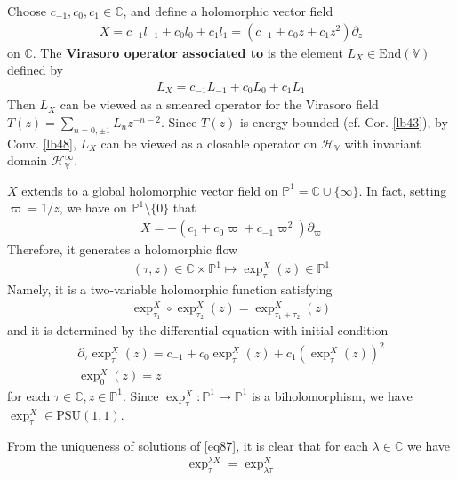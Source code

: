 \documentclass[12pt,b5paper,notitlepage]{article}
\theoremstyle{definition}
\theoremstyle{plain}
\newcommand{\End}{\mathrm{End}} %
\newcommand{\PSU}{\mathrm{PSU}(1,1)}
\newcommand{\Vbb}{\mathbb V}
\newcommand{\Cbb}{\mathbb C}
\newcommand{\Pbb}{\mathbb P}
\newcommand{\HV}{\mathcal H_{\mathbb V}}
\numberwithin{equation}{section}
\begin{document}
Choose $c_{-1},c_0,c_1\in\Cbb$, and define a holomorphic vector field
\begin{align}\label{eq83}
X=c_{-1}l_{-1}+c_0l_0+c_1l_1=(c_{-1}+c_0z+c_1z^2)\partial_z
\end{align}
on $\Cbb$. The \textbf{Virasoro operator associated to } is the element $L_X\in\End(\Vbb)$ defined by 
\begin{align}
L_X=c_{-1}L_{-1}+c_0L_0+c_1L_1
\end{align}
Then $L_X$ can be viewed as a smeared operator for the Virasoro field $T(z)=\sum_{n=0,\pm1}L_nz^{-n-2}$. Since $T(z)$ is energy-bounded (cf. Cor. \ref{lb43}), by Conv. \ref{lb48}, $L_X$ can be viewed as a closable operator on $\HV$ with invariant domain $\HV^\infty$.



$X$ extends to a global holomorphic vector field on $\Pbb^1=\Cbb\cup\{\infty\}$. In fact, setting $\varpi=1/z$, we have on $\Pbb^1\setminus\{0\}$ that
\begin{align}\label{eqb7}
X=-(c_1+c_0\varpi+c_{-1}\varpi^2)\partial_\varpi
\end{align}
Therefore, it generates a holomorphic flow 
\begin{align}
(\tau,z)\in\Cbb\times\Pbb^1\mapsto \exp^X_\tau(z)\in\Pbb^1
\end{align}
Namely, it is a two-variable holomorphic function satisfying
\begin{align}
\exp^X_{\tau_1}\circ\exp^X_{\tau_2}(z)=\exp^X_{\tau_1+\tau_2}(z)
\end{align}
and it is determined by the differential equation with initial condition
\begin{subequations}\label{eq87}
\begin{gather}
\partial_\tau\exp^X_\tau(z)=c_{-1}+c_0\exp^X_\tau(z)+c_1(\exp^X_\tau(z))^2\label{eq87a}\\
\exp_0^X(z)=z
\end{gather}
\end{subequations}
for each $\tau\in\Cbb,z\in\Pbb^1$. Since $\exp_\tau^X:\Pbb^1\rightarrow\Pbb^1$ is a biholomorphism, we have $\exp_\tau^X\in\PSU$. 


From the uniqueness of solutions of \eqref{eq87}, it is clear that for each $\lambda\in\Cbb$ we have
\begin{align}
\exp^{\lambda X}_\tau=\exp^X_{\lambda\tau}
\end{align}
\end{document}
